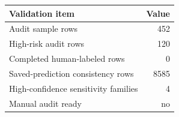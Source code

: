 \begin{tabular}{lr}
\toprule
Validation item & Value \\
\midrule
Audit sample rows & 452 \\
High-risk audit rows & 120 \\
Completed human-labeled rows & 0 \\
Saved-prediction consistency rows & 8585 \\
High-confidence sensitivity families & 4 \\
Manual audit ready & no \\
\bottomrule
\end{tabular}
